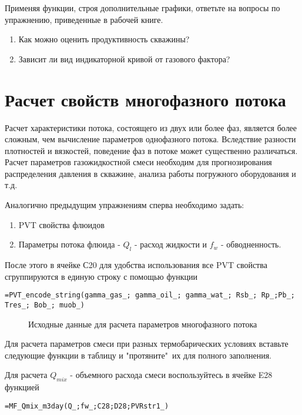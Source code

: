 Применяя функции, строя дополнительные графики, ответьте на вопросы по упражнению, приведенные в рабочей книге.

	\begin{enumerate}
		\item Как можно оценить продуктивность скважины?
		\item Зависит ли вид индикаторной кривой от газового фактора?
	\end{enumerate}



\section{Расчет свойств многофазного потока}

Расчет характеристики потока, состоящего из двух или более фаз, является более сложным, чем вычисление параметров однофазного потока. Вследствие разности плотностей и вязкостей, поведение фаз в потоке может существенно различаться. Расчет параметров газожидкостной смеси необходим для прогнозирования распределения давления в скважине, анализа работы погружного оборудования и т.д.
 
Аналогично предыдущим упражнениям сперва необходимо задать:
	\begin{enumerate}
		\item PVT свойства флюидов
		\item Параметры потока флюида - $Q_{l}$ - расход жидкости и $f_{w}$ - обводненность.
	\end{enumerate}
После этого в ячейке С20 для удобства использования все PVT свойства сгруппируются в единую строку с помощью функции

{ \small  \texttt{=PVT\_encode\_string(gamma\_gas\_; gamma\_oil\_; gamma\_wat\_; Rsb\_; Rp\_;Pb\_; Tres\_; Bob\_; muob\_)}}
		
\begin{figure}[h!]
	\center{\texttt{[image: Ex30\_1]}}
	\caption{Исходные данные для расчета параметров многофазного потока}
	\label{ris:Ex30_1}
\end{figure}

Для расчета параметров смеси при разных термобарических условиях вставьте следующие функции в таблицу и "протяните"\ их для полного заполнения.

Для расчета $Q_{mix}$ - объемного расхода смеси воспользуйтесь в ячейке E28 функцией

{ \small  \texttt{=MF\_Qmix\_m3day(Q\_;fw\_;C28;D28;PVRstr1\_)}}


